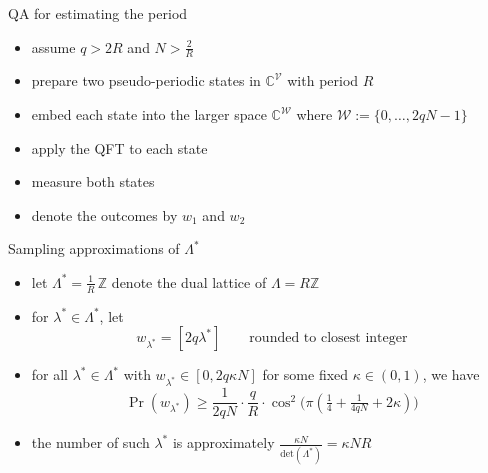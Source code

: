 \documentclass[slideColor]{prosper}
\renewcommand{\>}{\rangle}
\newcommand{\<}{\langle}
\begin{document}

\begin{slide}{QA for estimating the period}

\begin{itemize}
\item assume $q > 2 R$ and $N > \tfrac{2}{R}$

\bigskip
\item prepare two pseudo-periodic states in $\mathbb{C}^{\mathcal{V}}$ with period $R$

\bigskip
\item embed each state into the larger space $\mathbb{C}^\mathcal{W}$ where $\mathcal{W}:=\{0,\ldots,2qN-1\}$

\bigskip
\item apply the QFT to each state

\bigskip
\item measure both states

\bigskip
\item denote the outcomes by $w_1$ and $w_2$

\end{itemize}
\end{slide}


\begin{slide}{Sampling approximations of $\Lambda^*$}

\begin{itemize}
\item let $\Lambda^* = \tfrac{1}{R} \, \mathbb Z$ denote the dual lattice of $\Lambda= R \mathbb{Z}$

\medskip
\item for $\lambda^*\in\Lambda^*$, let 
\[
w_{\lambda^*} = 
[2q \lambda^*] \quad\quad \text{rounded to closest integer}
\]

\medskip
\item for all $\lambda^*\in\Lambda^*$ with $w_{\lambda^*} \in [0,2q\kappa N]$ for some fixed $\kappa\in(0,1)$, we have
\[
\Pr(w_{\lambda^*}) \ge \frac{1}{2qN} \cdot \frac{q}{R} \cdot \cos^2\big( \pi (\tfrac{1}{4} + \tfrac{1}{4qN} + 2\kappa) \big)
\]

\medskip
\item the number of such $\lambda^*$ is approximately $\tfrac{\kappa N}{\mathrm{det}(\Lambda^*)} = \kappa N R$

\end{itemize}

\end{slide}
\end{document}
